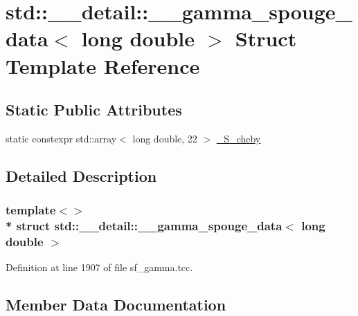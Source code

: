 \hypertarget{structstd_1_1____detail_1_1____gamma__spouge__data_3_01long_01double_01_4}{}\section{std\+:\+:\+\_\+\+\_\+detail\+:\+:\+\_\+\+\_\+gamma\+\_\+spouge\+\_\+data$<$ long double $>$ Struct Template Reference}
\label{structstd_1_1____detail_1_1____gamma__spouge__data_3_01long_01double_01_4}
\subsection*{Static Public Attributes}
\begin{DoxyCompactItemize}
\item 
static constexpr std\+::array$<$ long double, 22 $>$ \hyperlink{structstd_1_1____detail_1_1____gamma__spouge__data_3_01long_01double_01_4_ad1b0c2af63c28d0eaff89430d1b54589}{\+\_\+\+S\+\_\+cheby}
\end{DoxyCompactItemize}


\subsection{Detailed Description}
\subsubsection*{template$<$$>$\\*
struct std\+::\+\_\+\+\_\+detail\+::\+\_\+\+\_\+gamma\+\_\+spouge\+\_\+data$<$ long double $>$}



Definition at line 1907 of file sf\+\_\+gamma.\+tcc.



\subsection{Member Data Documentation}
